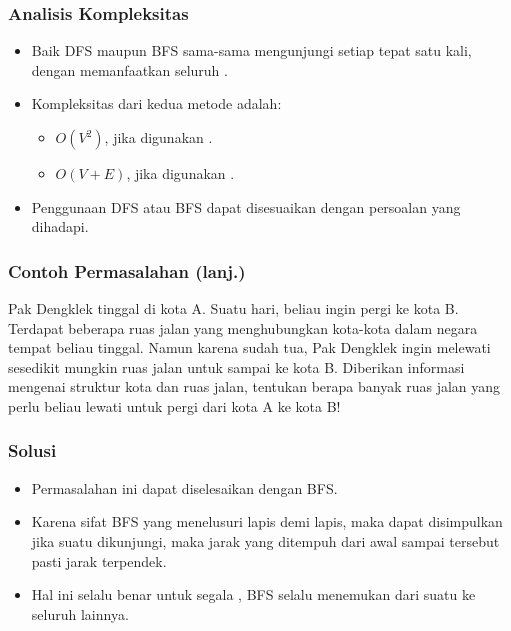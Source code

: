 \begin{frame}
\frametitle{Analisis Kompleksitas}
\begin{itemize}
  \item Baik DFS maupun BFS sama-sama mengunjungi setiap \fnode tepat satu kali, dengan memanfaatkan seluruh \fedge.
  \item Kompleksitas dari kedua metode adalah:
  \begin{itemize}
    \item $O(V^2)$, jika digunakan \fadjacencymatrix.
    \item $O(V + E)$, jika digunakan \fadjacencylist.
    \newline
  \end{itemize}
  \item Penggunaan DFS atau BFS dapat disesuaikan dengan persoalan yang dihadapi.
\end{itemize}
\end{frame}

\begin{frame}
\frametitle{Contoh Permasalahan (lanj.)}
Pak Dengklek tinggal di kota A. Suatu hari, beliau ingin pergi ke kota B. Terdapat beberapa ruas jalan yang menghubungkan kota-kota dalam negara tempat beliau tinggal. Namun karena sudah tua, Pak Dengklek ingin melewati sesedikit mungkin ruas jalan untuk sampai ke kota B.
\newline\newline
Diberikan informasi mengenai struktur kota dan ruas jalan, tentukan berapa banyak ruas jalan yang perlu beliau lewati untuk pergi dari kota A ke kota B!
\end{frame}

\begin{frame}
\frametitle{Solusi}
\begin{itemize}
  \item Permasalahan ini dapat diselesaikan dengan BFS. 
  \item Karena sifat BFS yang menelusuri \fnode lapis demi lapis, maka dapat disimpulkan jika suatu \fnode dikunjungi, maka jarak yang ditempuh dari awal sampai \fnode tersebut pasti jarak terpendek.
  \item Hal ini selalu benar untuk segala  \fgraph, BFS selalu menemukan  dari suatu \fnode ke seluruh \fnode lainnya.
\end{itemize}
\end{frame}

